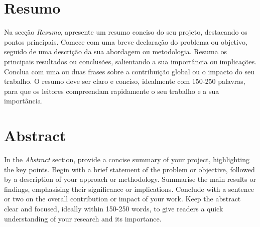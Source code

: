 \thispagestyle{plain} %
\chapter*{Resumo} %
Na secção \textit{Resumo}, apresente um resumo conciso do seu projeto, destacando os pontos principais. Comece com uma breve declaração do problema ou objetivo, seguido de uma descrição da sua abordagem ou metodologia. Resuma os principais resultados ou conclusões, salientando a sua importância ou implicações. Conclua com uma ou duas frases sobre a contribuição global ou o impacto do seu trabalho. O resumo deve ser claro e conciso, idealmente com 150-250 palavras, para que os leitores compreendam rapidamente o seu trabalho e a sua importância.


\blankpage

\chapter*{Abstract} %
In the \textit{Abstract} section, provide a concise summary of your project, highlighting the key points. Begin with a brief statement of the problem or objective, followed by a description of your approach or methodology. Summarise the main results or findings, emphasising their significance or implications. Conclude with a sentence or two on the overall contribution or impact of your work. Keep the abstract clear and focused, ideally within 150-250 words, to give readers a quick understanding of your research and its importance.


\blankpage